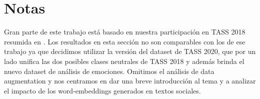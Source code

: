 \section{Notas}

Gran parte de este trabajo está basado en nuestra participación en TASS 2018\cite{overview_tass2018} resumida en \citet{atalaya_tass2018}. Los resultados en esta sección no son comparables con los de ese trabajo ya que decidimos utilizar la versión del dataset de TASS 2020\cite{garcia2020overview}, que por un lado unifica las dos posibles clases neutrales de TASS 2018 y además brinda el nuevo dataset de análisis de emociones. Omitimos el análisis de data augmentation y nos centramos en dar una breve introducción al tema y a analizar el impacto de los word-embeddings generados en textos sociales.
